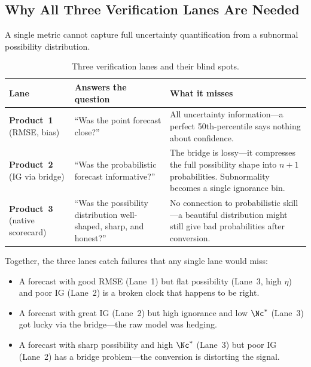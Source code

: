 \subsection{Why All Three Verification Lanes Are Needed}\label{sec:three_lanes}

A single metric cannot capture full uncertainty quantification from a subnormal possibility distribution.

\begin{table}[htbp]
\centering
\small
\caption{Three verification lanes and their blind spots.}
\label{tab:three_lanes}
\begin{tabularx}{\columnwidth}{>{\raggedright\arraybackslash}p{}XX}
\toprule
Lane & Answers the question & What it misses \\
\midrule
\textbf{Product~1} (RMSE, bias) & ``Was the point forecast close?'' & All uncertainty information---a perfect 50th-percentile says nothing about confidence. \\
\textbf{Product~2} (IG via bridge) & ``Was the probabilistic forecast informative?'' & The bridge is lossy---it compresses the full possibility shape into $n{+}1$ probabilities. Subnormality becomes a single ignorance bin. \\
\textbf{Product~3} (native scorecard) & ``Was the possibility distribution well-shaped, sharp, and honest?'' & No connection to probabilistic skill---a beautiful distribution might still give bad probabilities after conversion. \\
\bottomrule
\end{tabularx}
\end{table}

Together, the three lanes catch failures that any single lane would miss:

\begin{itemize}[leftmargin=2em]
\item A forecast with good RMSE (Lane~1) but flat possibility (Lane~3, high $\eta$) and poor IG (Lane~2) is a broken clock that happens to be right.
\item A forecast with great IG (Lane~2) but high ignorance and low $\Nc^*$ (Lane~3) got lucky via the bridge---the raw model was hedging.
\item A forecast with sharp possibility and high $\Nc^*$ (Lane~3) but poor IG (Lane~2) has a bridge problem---the conversion is distorting the signal.
\end{itemize}
